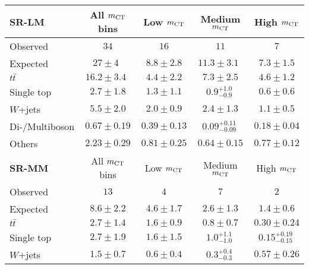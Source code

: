 \begin{table}
\begin{center}
{\small
\begin{tabular}{lcccc}
\toprule
{\textbf{ SR-LM}}           & All $m_{\textrm{CT}}$ bins          & Low $m_{\textrm{CT}}$         & Medium $m_{\textrm{CT}}$        & High $m_{\textrm{CT}}$    \\[-0.05cm]
\midrule
Observed           & $34$              & $16$              & $11$              & $7$                    \\
\midrule
Expected          & $27 \pm 4~~$          & $8.8 \pm 2.8$          & $11.3 \pm 3.1~~$          & $7.3 \pm 1.5$              \\
\midrule
$t\bar{t}$          & $16.2 \pm 3.4~~$          & $4.4 \pm 2.2$          & $7.3 \pm 2.5$          & $4.6 \pm 1.2$              \\
Single top          & $2.7 \pm 1.8$          & $1.3 \pm 1.1$          & $0.9_{-0.9}^{+1.0}~$          & $0.6 \pm 0.6$              \\
$W$+jets           & $5.5 \pm 2.0$          & $2.0 \pm 0.9$          & $2.4 \pm 1.3$          & $1.1 \pm 0.5$              \\
Di-/Multiboson          & $0.67 \pm 0.19$          & $0.39 \pm 0.13$          & $0.09_{-0.09}^{+0.11}~$          & $0.18 \pm 0.04$              \\
Others          & $2.23 \pm 0.29$          & $0.81 \pm 0.25$          & $0.64 \pm 0.15$          & $0.77 \pm 0.12$              \\
\bottomrule
\textbf{ SR-MM}           & All $m_{\textrm{CT}}$ bins          & Low $m_{\textrm{CT}}$         & Medium $m_{\textrm{CT}}$        & High $m_{\textrm{CT}}$    \\[-0.05cm]
\midrule
Observed           & $13$              & $4$              & $7$              & $2$                    \\
\midrule
 Expected          & $8.6 \pm 2.2$          & $4.6 \pm 1.7$          & $2.6 \pm 1.3$          & $1.4 \pm 0.6$              \\
\midrule
$t\bar{t}$          & $2.7 \pm 1.4$          & $1.6 \pm 0.9$          & $0.8 \pm 0.7$          & $0.30 \pm 0.24$              \\
Single top          & $2.7 \pm 1.9$          & $1.6 \pm 1.5$          & $1.0_{-1.0}^{+1.1}~$          & $0.15_{-0.15}^{+0.19}~$              \\
$W$+jets          & $1.5 \pm 0.7$          & $0.6 \pm 0.4$          & $0.3_{-0.3}^{+0.4}~$          & $0.57 \pm 0.26$              \\

\end{tabular}}
\end{center}
\end{table}
